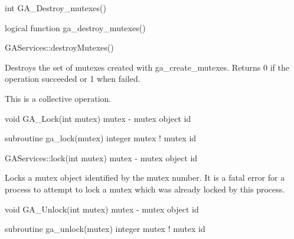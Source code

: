 \documentclass[12pt]{article}
\begin{document}

\begin{capi}
int GA_Destroy_mutexes()
\end{capi}

\begin{fapi}
logical function ga_destroy_mutexes()
\end{fapi}

\begin{cxxapi}
GAServices::destroyMutexes()
\end{cxxapi}

\begin{desc}

Destroys the set of mutexes created with ga_create_mutexes. Returns 0 if the operation succeeded or 1 when failed.

This is a collective operation.
\end{desc}


\begin{capi}
void GA_Lock(int mutex)
   mutex - mutex object id                                                \access{[input]} 
\end{capi}

\begin{fapi}
subroutine ga_lock(mutex)
   integer mutex                                                          \access{[input]}   
   ! mutex id
\end{fapi}

\begin{cxxapi}
GAServices::lock(int mutex)
mutex - mutex object id                                                   \access{[input]}
\end{cxxapi}

\begin{desc}

Locks a mutex object identified by the mutex number. It is a fatal error for a process to attempt to lock a mutex which was already locked by this process.
\end{desc}


\begin{capi}
void GA_Unlock(int mutex)
   mutex  - mutex object id                                               \access{[input]} 
\end{capi}

\begin{fapi}
subroutine ga_unlock(mutex)
   integer mutex                                                          \access{[input]}  
   ! mutex id
\end{fapi}
\end{document}
